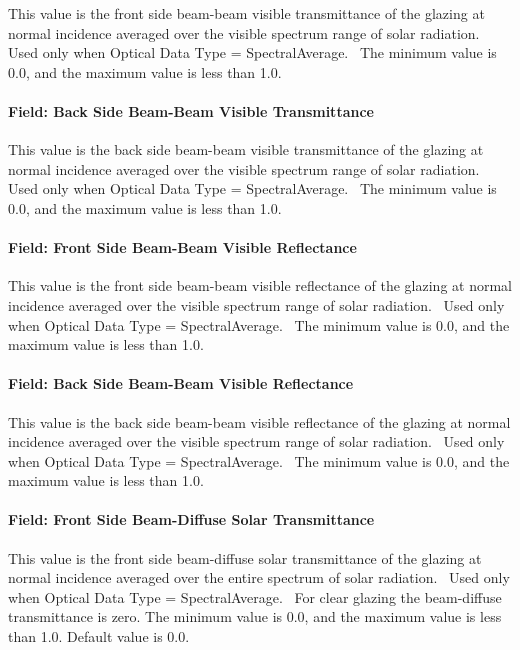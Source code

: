 This value is the front side beam-beam visible transmittance of the glazing at normal incidence averaged over the visible spectrum range of solar radiation.~ Used only when Optical Data Type = SpectralAverage.~ The minimum value is 0.0, and the maximum value is less than 1.0.

\paragraph{Field: Back Side Beam-Beam Visible Transmittance}\label{field-back-side-beam-beam-visible-transmittance}

This value is the back side beam-beam visible transmittance of the glazing at normal incidence averaged over the visible spectrum range of solar radiation.~ Used only when Optical Data Type = SpectralAverage.~ The minimum value is 0.0, and the maximum value is less than 1.0.

\paragraph{Field: Front Side Beam-Beam Visible Reflectance}\label{field-front-side-beam-beam-visible-reflectance}

This value is the front side beam-beam visible reflectance of the glazing at normal incidence averaged over the visible spectrum range of solar radiation.~ Used only when Optical Data Type = SpectralAverage.~ The minimum value is 0.0, and the maximum value is less than 1.0.

\paragraph{Field: Back Side Beam-Beam Visible Reflectance}\label{field-back-side-beam-beam-visible-reflectance}

This value is the back side beam-beam visible reflectance of the glazing at normal incidence averaged over the visible spectrum range of solar radiation.~ Used only when Optical Data Type = SpectralAverage.~ The minimum value is 0.0, and the maximum value is less than 1.0.

\paragraph{Field: Front Side Beam-Diffuse Solar Transmittance}\label{field-front-side-beam-diffuse-solar-transmittance}

This value is the front side beam-diffuse solar transmittance of the glazing at normal incidence averaged over the entire spectrum of solar radiation.~ Used only when Optical Data Type = SpectralAverage.~ For clear glazing the beam-diffuse transmittance is zero. The minimum value is 0.0, and the maximum value is less than 1.0. Default value is 0.0.

